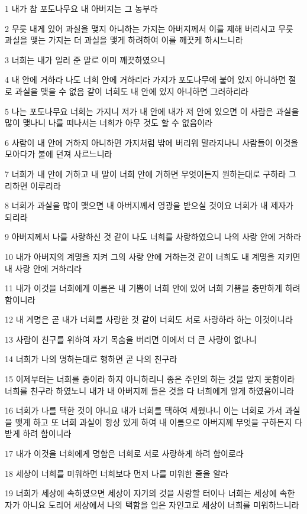\par 1 내가 참 포도나무요 내 아버지는 그 농부라
\par 2 무릇 내게 있어 과실을 맺지 아니하는 가지는 아버지께서 이를 제해 버리시고 무릇 과실을 맺는 가지는 더 과실을 맺게 하려하여 이를 깨끗케 하시느니라
\par 3 너희는 내가 일러 준 말로 이미 깨끗하였으니
\par 4 내 안에 거하라 나도 너희 안에 거하리라 가지가 포도나무에 붙어 있지 아니하면 절로 과실을 맺을 수 없음 같이 너희도 내 안에 있지 아니하면 그러하리라
\par 5 나는 포도나무요 너희는 가지니 저가 내 안에 내가 저 안에 있으면 이 사람은 과실을 많이 맺나니 나를 떠나서는 너희가 아무 것도 할 수 없음이라
\par 6 사람이 내 안에 거하지 아니하면 가지처럼 밖에 버리워 말라지나니 사람들이 이것을 모아다가 불에 던져 사르느니라
\par 7 너희가 내 안에 거하고 내 말이 너희 안에 거하면 무엇이든지 원하는대로 구하라 그리하면 이루리라
\par 8 너희가 과실을 많이 맺으면 내 아버지께서 영광을 받으실 것이요 너희가 내 제자가 되리라
\par 9 아버지께서 나를 사랑하신 것 같이 나도 너희를 사랑하였으니 나의 사랑 안에 거하라
\par 10 내가 아버지의 계명을 지켜 그의 사랑 안에 거하는것 같이 너희도 내 계명을 지키면 내 사랑 안에 거하리라
\par 11 내가 이것을 너희에게 이름은 내 기쁨이 너희 안에 있어 너희 기쁨을 충만하게 하려함이니라
\par 12 내 계명은 곧 내가 너희를 사랑한 것 같이 너희도 서로 사랑하라 하는 이것이니라
\par 13 사람이 친구를 위하여 자기 목숨을 버리면 이에서 더 큰 사랑이 없나니
\par 14 너희가 나의 명하는대로 행하면 곧 나의 친구라
\par 15 이제부터는 너희를 종이라 하지 아니하리니 종은 주인의 하는 것을 알지 못함이라 너희를 친구라 하였노니 내가 내 아버지께 들은 것을 다 너희에게 알게 하였음이니라
\par 16 너희가 나를 택한 것이 아니요 내가 너희를 택하여 세웠나니 이는 너희로 가서 과실을 맺게 하고 또 너희 과실이 항상 있게 하여 내 이름으로 아버지께 무엇을 구하든지 다 받게 하려 함이니라
\par 17 내가 이것을 너희에게 명함은 너희로 서로 사랑하게 하려 함이로라
\par 18 세상이 너희를 미워하면 너희보다 먼저 나를 미워한 줄을 알라
\par 19 너희가 세상에 속하였으면 세상이 자기의 것을 사랑할 터이나 너희는 세상에 속한 자가 아니요 도리어 세상에서 나의 택함을 입은 자인고로 세상이 너희를 미워하느니라
